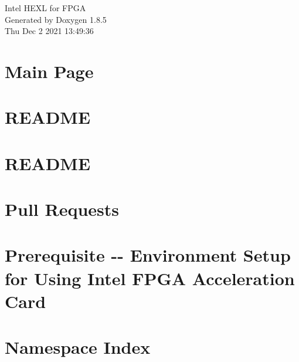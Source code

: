 \documentclass[twoside]{book}
\newcommand{\clearemptydoublepage}{%
  \newpage{\pagestyle{empty}\cleardoublepage}%
}
\begin{document}
\hypersetup{pageanchor=false}
\begin{titlepage}
\vspace*{7cm}
\begin{center}%
{\Large Intel H\-E\-X\-L for F\-P\-G\-A }\\
\vspace*{1cm}
{\large Generated by Doxygen 1.8.5}\\
\vspace*{0.5cm}
{\small Thu Dec 2 2021 13:49:36}\\
\end{center}
\end{titlepage}
\clearemptydoublepage
\tableofcontents
\clearemptydoublepage
{}
\hypersetup{pageanchor=true}

\chapter{Main Page}
\label{index}\hypertarget{index}{}
\chapter{R\-E\-A\-D\-M\-E}
\label{md__home_ymeng12_he-fpga-github_examples_README}
\hypertarget{md__home_ymeng12_he-fpga-github_examples_README}{}

\chapter{R\-E\-A\-D\-M\-E}
\label{md__home_ymeng12_he-fpga-github_README}
\hypertarget{md__home_ymeng12_he-fpga-github_README}{}

\chapter{Pull Requests}
\label{md__home_ymeng12_he-fpga-github_CONTRIBUTING}
\hypertarget{md__home_ymeng12_he-fpga-github_CONTRIBUTING}{}

\chapter{Prerequisite -\/-\/ Environment Setup for Using Intel F\-P\-G\-A Acceleration Card}
\label{md__home_ymeng12_he-fpga-github_PREREQUISITE}
\hypertarget{md__home_ymeng12_he-fpga-github_PREREQUISITE}{}

\chapter{Namespace Index}

\end{document}
